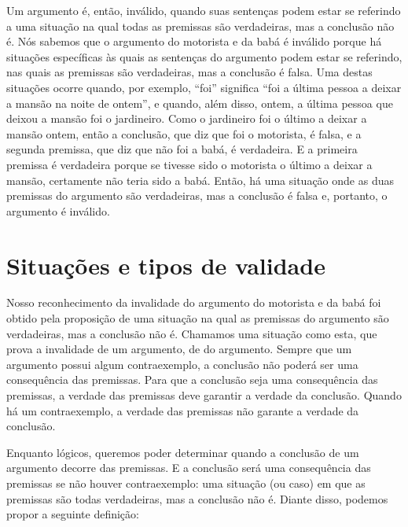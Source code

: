 Um argumento é, então, inválido, quando suas sentenças podem estar se referindo a uma situação na qual todas as premissas são verdadeiras, mas a conclusão não é.
Nós sabemos que o argumento do motorista e da babá é inválido porque há situações específicas às quais as sentenças do argumento podem estar se referindo, nas quais as premissas são verdadeiras, mas a conclusão é falsa.
Uma destas situações ocorre quando, por exemplo, ``foi'' significa ``foi a última pessoa a deixar a mansão na noite de ontem'', e quando, além disso, ontem, a última pessoa que deixou a mansão foi o jardineiro.
Como o jardineiro foi o último a deixar a mansão ontem, então a conclusão, que diz que foi o motorista, é falsa, e a segunda premissa, que diz que não foi a babá, é verdadeira.
E a primeira premissa é verdadeira porque se tivesse sido o motorista o último a deixar a mansão, certamente não teria sido a babá.
Então, há uma situação onde as duas premissas do argumento são verdadeiras, mas a conclusão é falsa e, portanto, o argumento é inválido.


\section{Situações e tipos de validade}
\label{ss:Validade}

Nosso reconhecimento da invalidade do argumento do motorista e da babá foi obtido pela proposição de uma situação na qual as premissas do argumento são verdadeiras, mas a conclusão não é.
Chamamos uma situação como esta, que prova a invalidade de um argumento, de  do argumento.
Sempre que um argumento possui algum contraexemplo, a conclusão não poderá ser uma consequência das premissas.
Para que a conclusão seja uma consequência das premissas, a verdade das premissas deve garantir a verdade da conclusão. Quando há um contraexemplo, a verdade das premissas não garante a verdade da conclusão.

Enquanto lógicos, queremos poder determinar quando a conclusão de um argumento decorre das premissas.
E a conclusão será uma consequência das premissas se não houver contraexemplo: uma situação (ou caso) em que as premissas são todas verdadeiras, mas a conclusão não é.
Diante disso, podemos propor a seguinte definição:


